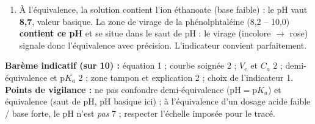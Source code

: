 \documentclass[11pt]{article}
\begin{document}
\begin{corrige}
\begin{enumerate}
  \item À l'équivalence, la solution contient l'ion éthanoate (base faible) : le pH vaut \textbf{8,7}, valeur basique. La zone de virage de la phénolphtaléine (8,2 -- 10,0) \textbf{contient ce pH} et se situe dans le saut de pH : le virage (incolore $\to$ rose) signale donc l'équivalence avec précision. L'indicateur convient parfaitement.
\end{enumerate}
\textbf{Barème indicatif (sur 10) :} équation 1 ; courbe soignée 2 ; $V_e$ et $C_a$ 2 ; demi-équivalence et $\mathrm{p}K_a$ 2 ; zone tampon et explication 2 ; choix de l'indicateur 1. \\
\textbf{Points de vigilance :} ne pas confondre demi-équivalence ($\mathrm{pH} = \mathrm{p}K_a$) et équivalence (saut de pH, pH basique ici) ; à l'équivalence d'un dosage acide faible / base forte, le pH n'est \emph{pas} 7 ; respecter l'échelle imposée pour le tracé.
\end{corrige}
\end{document}
